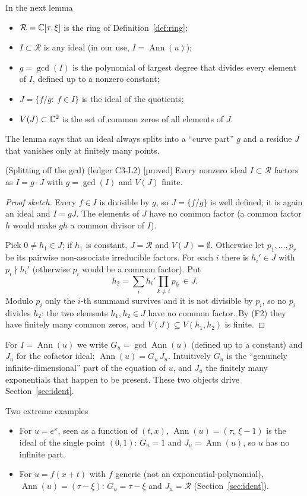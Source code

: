 \documentclass[11pt,a4paper]{article}
\theoremstyle{definition}
\newcommand{\badge}[2]{\textcolor{#1}{\textsf{\footnotesize[#2]}}}
\newcommand{\proved}[1][]{\badge{cC}{proved#1}}
\newcommand{\led}[1]{\textcolor{cG}{\textsf{\footnotesize(ledger #1)}}}
\newcommand{\Ann}{\operatorname{Ann}}
\newcommand{\ring}{\mathcal{R}}
\newcommand{\Var}{V}
\DeclareMathOperator{\Gcd}{gcd}
\begin{document}
\begin{notebox}{In the next lemma}
\begin{itemize}[nosep]
\item $\ring=\C[\tau,\xi]$ is the ring of Definition~\ref{def:ring};
\item $I\subset\ring$ is any ideal (in our use, $I=\Ann(u)$);
\item $g=\Gcd(I)$ is the polynomial of largest degree that divides every element of $I$, defined up to a nonzero constant;
\item $J=\{f/g:\ f\in I\}$ is the ideal of the quotients;
\item $\Var(J)\subset\C^2$ is the set of common zeros of all elements of $J$.
\end{itemize}
The lemma says that an ideal always splits into a ``curve part'' $g$ and a residue $J$ that vanishes only at finitely many points.
\end{notebox}
\begin{lemma}{(Splitting off the gcd) \led{C3-L2} \proved[]}\label{lem:gcd}
Every nonzero ideal $I\subset\ring$ factors as $I=g\cdot J$ with $g=\Gcd(I)$ and $\Var(J)$ finite.
\end{lemma}
\begin{proof}[Proof sketch]
Every $f\in I$ is divisible by $g$, so $J=\{f/g\}$ is well defined; it is again an ideal and $I=gJ$. The elements of $J$ have no common factor (a common factor $h$ would make $gh$ a common divisor of $I$).

Pick $0\ne h_1\in J$; if $h_1$ is constant, $J=\ring$ and $\Var(J)=\emptyset$. Otherwise let $p_1,\dots,p_r$ be its pairwise non-associate irreducible factors. For each $i$ there is $h_i'\in J$ with $p_i\nmid h_i'$ (otherwise $p_i$ would be a common factor). Put
\[
h_2=\sum_ih_i'\prod_{k\ne i}p_k\ \in J .
\]
Modulo $p_i$ only the $i$-th summand survives and it is not divisible by $p_i$, so no $p_i$ divides $h_2$: the two elements $h_1,h_2\in J$ have no common factor. By (F2) they have finitely many common zeros, and $\Var(J)\subseteq\Var(h_1,h_2)$ is finite.
\end{proof}

For $I=\Ann(u)$ we write $G_u=\Gcd\Ann(u)$ (defined up to a constant) and $J_u$ for the cofactor ideal: $\Ann(u)=G_u\,J_u$. Intuitively $G_u$ is the ``genuinely infinite-dimensional'' part of the equation of $u$, and $J_u$ the finitely many exponentials that happen to be present. These two objects drive Section~\ref{sec:ident}.

\begin{aside}{Two extreme examples}
\begin{itemize}[nosep]
\item For $u=e^{x}$, seen as a function of $(t,x)$, $\Ann(u)=(\tau,\ \xi-1)$ is the ideal of the single point $(0,1)$: $G_u=1$ and $J_u=\Ann(u)$, so $u$ has no infinite part.
\item For $u=f(x+t)$ with $f$ generic (not an exponential-polynomial), $\Ann(u)=(\tau-\xi)$: $G_u=\tau-\xi$ and $J_u=\ring$ (Section~\ref{sec:ident}).
\end{itemize}
\end{aside}
\end{document}
